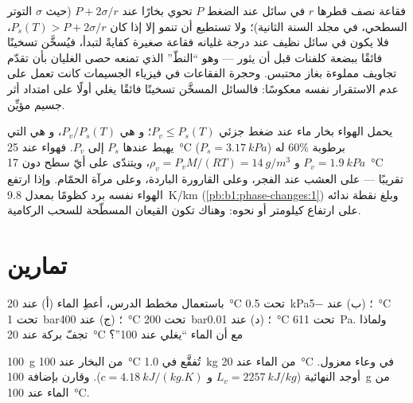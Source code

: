 \begin{remark}\label{rem:b1:phase-changes:nucleation}
فقاعة نصف قطرها $r$ في سائل عند الضغط $P$ تحوي بخارًا عند
$P + 2\sigma/r$ (حيث $\sigma$ التوتر السطحي، في مجلد السنة الثانية)؛ ولا تستطيع
أن تنمو إلا إذا كان $P_s(T) > P + 2\sigma/r$، فلا يكون في سائل نظيف عند درجة غليانه
فقاعة صغيرة كفايةً لتبدأ، فيُسخَّن تسخينًا فائقًا ببضعة كلفنات
قبل أن يثور --- وهو ``النطّ'' الذي تمنعه حصى الغليان بأن
تقدّم تجاويف مملوءة بغاز محتبس. وحجرة الفقاعات في فيزياء
الجسيمات كانت تعمل على عدم الاستقرار نفسه معكوسًا: فالسائل المسخَّن تسخينًا فائقًا
يغلي أولًا على امتداد أثر جسيم مؤيِّن.
\end{remark}

\begin{example}\label{ex:b1:phase-changes:dew}
يحمل الهواء بخار ماء عند ضغط جزئي $P_v \leq P_s(T)$؛ و\emph{} هي $P_v/P_s(T)$، و\emph{} هي
 التي يهبط عندها $P_s$ إلى $P_v$. فهواء عند \qty{25}{\degreeCelsius}
($P_s = \qty{3.17}{kPa}$) برطوبة $60\%$ له $P_v = \qty{1.9}{kPa}$
و $\rho_v = P_vM/(RT) = \qty{14}{g/m^3}$، ويتندّى على أيّ سطح دون
\qty{17}{\degreeCelsius} تقريبًا --- على العشب عند الفجر، وعلى القارورة الباردة، وعلى
مرآة الحمّام. وإذا ارتفع الهواء نفسه برد كظومًا بمعدل
\qty{9.8}{K/km} (\cref{pb:b1:phase-changes:1}) وبلغ نقطة ندائه على ارتفاع
كيلومتر أو نحوه: وهناك تكون القيعان المسطّحة للسحب الركامية.
\end{example}

\section{تمارين}

\begin{exercise}[$\star$]\label{exo:b1:phase-changes:1}
باستعمال مخطط الدرس، أعطِ  الماء (أ) عند
\qty{20}{\degreeCelsius} تحت \qty{0.5}{kPa}؛ (ب) عند \qty{-5}{\degreeCelsius}
تحت \qty{1}{bar}؛ (ج) عند \qty{400}{\degreeCelsius} تحت \qty{200}{bar}؛
(د) عند \qty{0.01}{\degreeCelsius} تحت \qty{611}{Pa}. ولماذا تجفّ بركة
عند \qty{20}{\degreeCelsius} مع أن الماء ``يغلي عند 100''؟
\end{exercise}

\begin{exercise}[$\star$]\label{exo:b1:phase-changes:2}
\qty{100}{g} من البخار عند \qty{100}{\degreeCelsius} تُفقَّع في
\qty{1.0}{kg} من الماء عند \qty{20}{\degreeCelsius} في وعاء معزول.
أوجد  النهائية ($L_v = \qty{2257}{kJ/kg}$ و $c = \qty{4.18}{kJ/(kg.K)}$).
وقارن بإضافة \qty{100}{g} من الماء عند \qty{100}{\degreeCelsius}.
\end{exercise}

